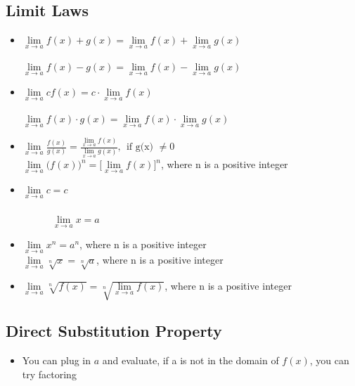\documentclass{report}
\begin{document}
      \subsection{Limit Laws}
      \begin{itemize}
        \item $\lim\limits_{x \to a}{f(x) + g(x)} = \lim\limits_{x \to a}{f(x)} + \lim\limits_{x \to a}{g(x)}$ \ \ \ \  \ \ \ \ \ \ \ \ \ \ \ \ \ \ \ \ \ \ \ \ \ \ \ \ \ \ \ \ \ \ \  \textbullet $\lim\limits_{x \to a}{f(x)- g(x)} = \lim\limits_{x \to a}{f(x)} - \lim\limits_{x \to a}{g(x)} $
        \item $\lim\limits_{x \to a}{cf(x)} = c \cdot \lim\limits_{x \to a}{f(x)} $ \ \ \ \ \ \ \ \ \ \ \ \ \ \ \ \ \ \ \ \ \ \ \ \ \ \ \ \ \ \ \ \ \ \ \ \ \ \ \ \ \ \ \ \ \ \ \ \ \ \ \ \ \ \  \textbullet $\lim\limits_{x \to a}{f(x)\cdot g(x)} = \lim\limits_{x \to a}{f(x) } \cdot \lim\limits_{x \to a}{g(x)} $
        \item $\lim\limits_{x \to a}{\frac{f(x)}{g(x)}} = \frac{\lim\limits_{x \to a}{f(x)}}{\lim\limits_{x \to a}{g(x)}},\ \ \text{if g(x) $\neq0$} $  \ \  \ \ \ \ \  \ \ \ \ \ \ \ \ \ \ \ \ \textbullet $\lim\limits_{x \to a}{\bigg(f(x)\bigg)^{n}}  = \bigg[\lim\limits_{x \to a}{f(x)}\bigg]^{n}$, where n is a positive integer
        \item $\lim\limits_{x \to a}{c} = c $  \ \ \ \ \ \ \ \ \ \ \ \ \ \ \ \ \ \ \ \ \ \ \ \  \ \ \ \ \ \ \ \ \ \ \ \ \ \ \ \ \ \ \ \ \ \ \ \ \ \ \ \  \ \ \ \ \  \ \ \ \ \ \ \    \  \ \ \ \ \ \ \  \ \ \textbullet $\lim\limits_{x \to a}{x} = a $
        \item $\lim\limits_{x \to a}{x^{n}} = a^{n}$, where n is a positive integer \ \ \ \ \ \  \ \ \ \ \ \ \  \ \ \ \ \ \ \ \ \  \ \ \textbullet $\lim\limits_{x \to a}{\sqrt[n]{x}} = \sqrt[n]{a} $, where n is a positive integer
        \item $\lim\limits_{x \to a}{\sqrt[n]{f(x)}} = \sqrt[n]{\lim\limits_{x \to a}{f(x)}} $, where n is a positive integer
      \end{itemize}

      \bigbreak \noindent \bigbreak \noindent 
      \subsection{Direct Substitution Property}
      \begin{itemize}
        \item You can plug in $a$ and evaluate, if a is not in the domain of $f(x)$, you can try factoring
      \end{itemize}
\end{document}
